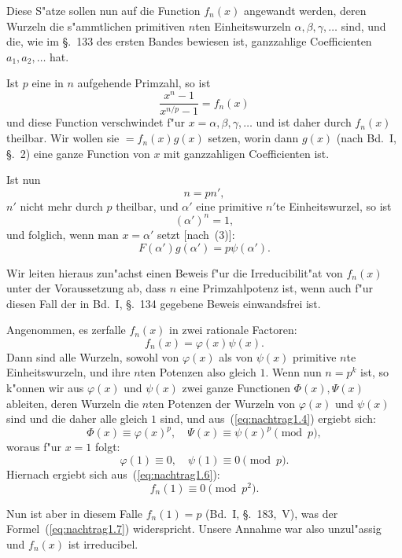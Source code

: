 \documentclass[10pt,a4paper]{article}
\theoremstyle{weberstyle}
\begin{document}
Diese S"atze sollen nun auf die Function $f_n(x)$ angewandt werden, deren
Wurzeln die s"ammtlichen primitiven $n$ten Einheitswurzeln
$\alpha,\beta,\gamma,\dots$ sind, und die, wie im \S.~133 des ersten Bandes
bewiesen ist, ganzzahlige Coefficienten $a_1,a_2,\dots$ hat.

Ist $p$ eine in $n$ aufgehende Primzahl, so ist
\[
\frac{x^n-1}{x^{n/p}-1} = f_n(x)
\]
und diese Function verschwindet f"ur $x=\alpha,\beta,\gamma,\dots$ und ist
daher durch $f_n(x)$ theilbar. Wir wollen sie $=f_n(x)g(x)$ setzen, worin
dann $g(x)$ (nach Bd.~I, \S.~2) eine ganze Function von $x$ mit
ganzzahligen Coefficienten ist.

Ist nun
\[
n=pn',
\]
$n'$ nicht mehr durch $p$ theilbar, und $\alpha'$ eine primitive $n'$te
Einheitswurzel, so ist
\[
(\alpha')^n = 1,
\]
und folglich, wenn man $x=\alpha'$ setzt [nach~(3)]:
\begin{equation}\label{eq:nachtrag1.5}
F(\alpha')g(\alpha') = p\psi(\alpha').
\end{equation}

Wir leiten hieraus zun"achst einen Beweis f"ur die Irreducibilit"at von
$f_n(x)$ unter der Voraussetzung ab, dass $n$ eine Primzahlpotenz ist,
wenn auch f"ur diesen Fall der in Bd.~I, \S.~134 gegebene Beweis
einwandsfrei ist.

Angenommen, es zerfalle $f_n(x)$ in zwei rationale Factoren:
\begin{equation}\label{eq:nachtrag1.6}
f_n(x) = \varphi(x)\psi(x).
\end{equation}
Dann sind alle Wurzeln, sowohl von $\varphi(x)$ als von $\psi(x)$ primitive
$n$te Einheitswurzeln, und ihre $n$ten Potenzen also gleich $1$. Wenn
nun $n=p^k$ ist, so k"onnen wir aus $\varphi(x)$ und $\psi(x)$ zwei ganze
Functionen $\Phi(x),\Psi(x)$ ableiten, deren Wurzeln die $n$ten Potenzen
der Wurzeln von $\varphi(x)$ und $\psi(x)$ sind und die daher alle gleich
$1$ sind, und aus~(\ref{eq:nachtrag1.4}) ergiebt sich:
\[
\Phi(x) \equiv \varphi(x)^p,\quad \Psi(x) \equiv \psi(x)^p\pmod{p},
\]
woraus f"ur $x=1$ folgt:
\[
\varphi(1)\equiv 0,\quad \psi(1)\equiv 0\pmod{p}.
\]
Hiernach ergiebt sich aus~(\ref{eq:nachtrag1.6}):
\begin{equation}\label{eq:nachtrag1.7}
f_n(1) \equiv 0\pmod{p^2}.
\end{equation}

Nun ist aber in diesem Falle $f_n(1)=p$ (Bd.~I, \S.~183,~V), was der
Formel~(\ref{eq:nachtrag1.7}) widerspricht. Unsere Annahme war also
unzul"assig und $f_n(x)$ ist irreducibel.
\end{document}
